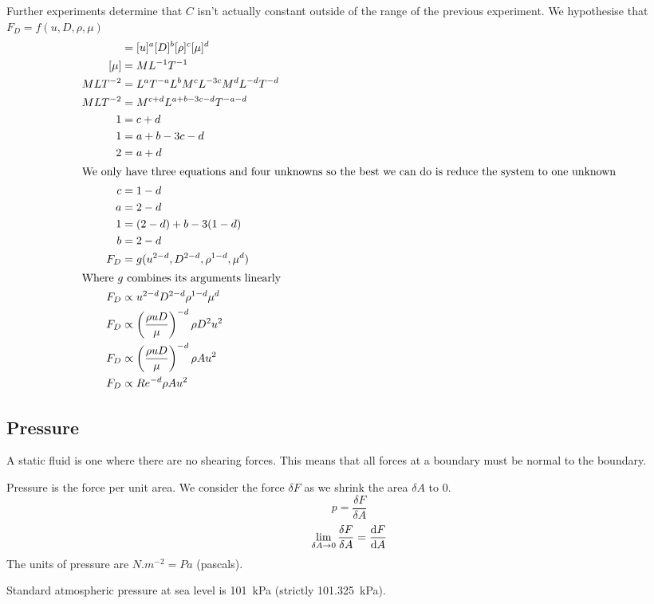 \documentclass{article}
\begin{document}
    Further experiments determine that \(C\) isn't actually constant outside of the range of the previous experiment.
    We hypothesise that \(F_D = f(u, D, \rho, \mu)\)
    \begin{align*}
        [F_D] &= [u]^a[D]^b[\rho]^c[\mu]^d\\
        [\mu] &= ML^{-1}T^{-1}\\
        MLT^{-2} &= L^aT^{-a}L^bM^cL^{-3c}M^dL^{-d}T^{-d}\\
        MLT^{-2} &= M^{c + d}L^{a + b - 3c - d}T^{-a-d}\\
        1 &= c + d\\
        1 &= a + b - 3c - d\\
        2 &= a + d\\
        \intertext{We only have three equations and four unknowns so the best we can do is reduce the system to one unknown}
        c &= 1 - d\\
        a &= 2 - d\\
        1 &= (2 - d) + b - 3(1 - d)\\
        b &= 2 - d\\
        F_D &= g(u^{2-d}, D^{2-d}, \rho^{1-d}, \mu^d)\\
        \intertext{Where \(g\) combines its arguments linearly}
        F_D &\propto u^{2-d}D^{2-d}\rho^{1-d}\mu^d\\
        F_D &\propto \left(\frac{\rho u D}{\mu}\right)^{-d}\rho D^2u^2\\
        F_D &\propto \left(\frac{\rho u D}{\mu}\right)^{-d}\rho Au^2\\
        F_D &\propto Re^{-d}\rho Au^2
    \end{align*}
    
    \subsection{Pressure}
    A static fluid is one where there are no shearing forces. This means that all forces at a boundary must be normal to the boundary.
    
    Pressure is the force per unit area. We consider the force \(\delta F\) as we shrink the area \(\delta A\) to 0.
    \[p = \frac{\delta F}{\delta A}\]
    \[\lim_{\delta A\to 0} \frac{\delta F}{\delta A} = \dv{F}{A}\]
    The units of pressure are \(\si{N.m^{-2}} = \si{Pa}\) (pascals).
    
    Standard atmospheric pressure at sea level is \SI{101}{kPa} (strictly \SI{101.325}{kPa}).
    
\end{document}

